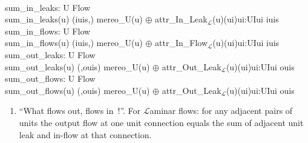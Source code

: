 \mnewfoil\LLLL

\bp
{}\\
\>sum\_in\_leaks: U {\RIGHTARROW} Flow\\
\>sum\_in\_leaks(u) {\IS}  (iuis,) {\EQ} mereo\_U(u)  $\oplus$ {\LBRACE}attr\_In\_Leak$_{\mathcal{L}}$(u)(ui){\BAR}ui:UI{\RDOT}ui {\ISIN} iuis{\RBRACE} \\
\>sum\_in\_flows: U {\RIGHTARROW} Flow\\
\>sum\_in\_flows(u) {\IS}  (iuis,) {\EQ} mereo\_U(u)  $\oplus$ {\LBRACE}attr\_In\_Flow$_{\mathcal{L}}$(u)(ui){\BAR}ui:UI{\RDOT}ui {\ISIN} iuis{\RBRACE} \\
\>sum\_out\_leaks: U {\RIGHTARROW} Flow\\
\>sum\_out\_leaks(u) {\IS}  (,ouis) {\EQ} mereo\_U(u)  $\oplus$ {\LBRACE}attr\_Out\_Leak$_{\mathcal{L}}$(u)(ui){\BAR}ui:UI{\RDOT}ui {\ISIN} ouis{\RBRACE} \\
\>sum\_out\_flows: U {\RIGHTARROW} Flow\\
\>sum\_out\_flows(u) {\IS}  (,ouis) {\EQ} mereo\_U(u)  $\oplus$ {\LBRACE}attr\_Out\_Leak$_{\mathcal{L}}$(u)(ui){\BAR}ui:UI{\RDOT}ui {\ISIN} ouis{\RBRACE} 
\ep

\mnewfoil

\begin{enumerate}\setei
\item \label{pefl01} ``What flows out, flows in~!''. For $\mathcal{L}$aminar
                     flows: for any adjacent pairs of  units
                     the output flow at one unit connection equals the
                     sum of adjacent unit leak and in-flow at that connection.
\savei\end{enumerate}


